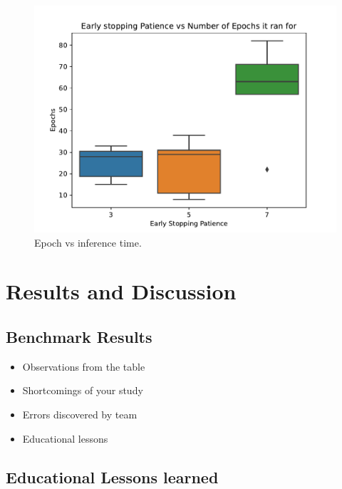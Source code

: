 \documentclass[sigplan,screen]{acmart}
\begin{document}
\begin{figure}[htb]
\centering\includegraphics[width=1.0\columnwidth]{images/early_stopping.pdf}
\caption{Epoch vs inference time.}
\label{fig:early-stopping}
\end{figure}

\section{Results and Discussion}

\subsection{Benchmark Results}

\begin{itemize}
    \item Observations from the table
    \item Shortcomings of your study 
    \item Errors discovered by team
    \item Educational lessons
\end{itemize}




\subsection{Educational Lessons learned}

\end{document}
